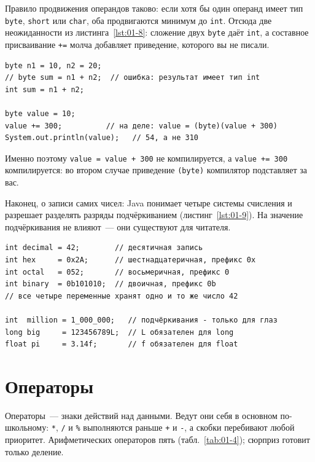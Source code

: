 Правило продвижения операндов таково: если хотя бы один операнд имеет тип
\texttt{byte}, \texttt{short} или \texttt{char}, оба продвигаются минимум до
\texttt{int}. Отсюда две неожиданности из листинга~\ref{lst:01-8}: сложение двух
\texttt{byte} даёт \texttt{int}, а составное присваивание \texttt{+=} молча
добавляет приведение, которого вы не писали.

\begin{listing}[H]
\begin{verbatim}
byte n1 = 10, n2 = 20;
// byte sum = n1 + n2;  // ошибка: результат имеет тип int
int sum = n1 + n2;

byte value = 10;
value += 300;          // на деле: value = (byte)(value + 300)
System.out.println(value);   // 54, а не 310
\end{verbatim}
\caption{Продвижение операндов и составное присваивание}
\label{lst:01-8}
\end{listing}

Именно поэтому \texttt{value = value + 300} не компилируется, а
\texttt{value += 300} компилируется: во втором случае приведение
\texttt{(byte)} компилятор подставляет за вас.

Наконец, о записи самих чисел: Java понимает четыре системы счисления и
разрешает разделять разряды подчёркиванием (листинг~\ref{lst:01-9}). На значение
подчёркивания не влияют~--- они существуют для читателя.

\begin{listing}[H]
\begin{verbatim}
int decimal = 42;        // десятичная запись
int hex     = 0x2A;      // шестнадцатеричная, префикс 0x
int octal   = 052;       // восьмеричная, префикс 0
int binary  = 0b101010;  // двоичная, префикс 0b
// все четыре переменные хранят одно и то же число 42

int  million = 1_000_000;   // подчёркивания - только для глаз
long big     = 123456789L;  // L обязателен для long
float pi     = 3.14f;       // f обязателен для float
\end{verbatim}
\caption{Числовые литералы}
\label{lst:01-9}
\end{listing}

\section{Операторы}

Операторы~--- знаки действий над данными. Ведут они себя в основном
по-школьному: \texttt{*}, \texttt{/} и \texttt{\%} выполняются раньше
\texttt{+} и \texttt{-}, а скобки перебивают любой приоритет. Арифметических
операторов пять (табл.~\ref{tab:01-4}); сюрприз готовит только деление.

